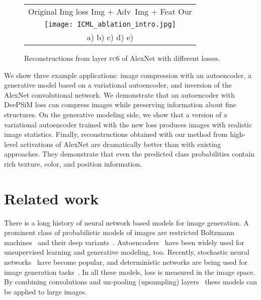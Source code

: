\documentclass{article}
\newcommand{\tcb}[1]{\textcolor{red}{#1}}    %
\newcommand{\tca}[1]{\textcolor{alexey}{#1}}    %
\newcommand{\fc}{\textsc{fc}}
\newcommand{\ourapproach}{DeePSiM }
\begin{document}
\begin{figure}[b]
\begin{center}
\setlength{\tabcolsep}{0.1cm}
\renewcommand{\arraystretch}{1}
\small{
  \begin{tabular}{c}
  Original \;\;\; Img loss \; Img + Adv\,  Img + Feat \quad\; Our\;\;\;\;  \\
  \texttt{[image: ICML\_ablation\_intro.jpg]}\\
  a) \quad\qquad\;\; b) \quad\qquad\; c) \quad\qquad\; d) \qquad\quad\;\; e)
   \end{tabular}}
   \vspace{-0.15cm}
\end{center}
   \caption{Reconstructions from layer \fc6 of AlexNet with different losses.}
\label{fig:ablation_intro}
\end{figure}

We show three example applications: image compression with an autoencoder, a generative model based on a variational autoencoder, and inversion of the AlexNet convolutional network. 
We demonstrate that an autoencoder with \ourapproach loss can compress images  while preserving information about fine structures.
On the generative modeling side, we show that a version of a variational autoencoder trained with the new loss produces images with realistic image statistics. 
Finally, reconstructions obtained with our method from high-level activations of AlexNet are dramatically better than with existing approaches. They demonstrate that even the predicted class probabilities contain rich texture, color, and position information.



\section{Related work}
There is a long history of neural network based models for image generation.
A prominent class of probabilistic models of images are restricted Boltzmann machines~\citep{Hinton_1986, Smolensky_1986, Hinton_Science2006} and their deep variants~\citep{Hinton_NC2006,Salakhutdinov_2009,Lee_ICML2009}.
Autoencoders~\citep{Hinton_Science2006, Vincent_ICML2008} have been widely used for unsupervised learning and generative modeling, too.
Recently, stochastic neural networks~\citep{Bengio_ICML2014, Kingma_NIPS2014, Gregor_ICML2015} have become popular, and deterministic networks are being used for image generation tasks~\citep{Dosovitskiy_CVPR2015}.
In all these models, loss is measured in the image space.
By combining convolutions and un-pooling (upsampling) layers~\citep{Lee_ICML2009, Goodfellow_NIPS2014, Dosovitskiy_CVPR2015} these models can be applied to large images.
\end{document}

